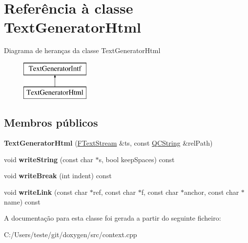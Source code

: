 \hypertarget{class_text_generator_html}{\section{Referência à classe Text\-Generator\-Html}
\label{class_text_generator_html}
}
Diagrama de heranças da classe Text\-Generator\-Html\begin{figure}[H]
\begin{center}
\leavevmode
\includegraphics[height=2.000000cm]{class_text_generator_html}
\end{center}
\end{figure}
\subsection*{Membros públicos}
\begin{DoxyCompactItemize}
\item 
\hypertarget{class_text_generator_html_a359ec0e7429b48fa4815f8b8247bb565}{{\bfseries Text\-Generator\-Html} (\hyperlink{class_f_text_stream}{F\-Text\-Stream} \&ts, const \hyperlink{class_q_c_string}{Q\-C\-String} \&rel\-Path)}\label{class_text_generator_html_a359ec0e7429b48fa4815f8b8247bb565}

\item 
\hypertarget{class_text_generator_html_a49452ae8a5acd4e287686e1bdbac5c1f}{void {\bfseries write\-String} (const char $\ast$s, bool keep\-Spaces) const }\label{class_text_generator_html_a49452ae8a5acd4e287686e1bdbac5c1f}

\item 
\hypertarget{class_text_generator_html_ac40cf1dd4a7804346c00562baa8a74b2}{void {\bfseries write\-Break} (int indent) const }\label{class_text_generator_html_ac40cf1dd4a7804346c00562baa8a74b2}

\item 
\hypertarget{class_text_generator_html_af1d2ebe4365612b97bf599bac5b67541}{void {\bfseries write\-Link} (const char $\ast$ref, const char $\ast$f, const char $\ast$anchor, const char $\ast$name) const }\label{class_text_generator_html_af1d2ebe4365612b97bf599bac5b67541}

\end{DoxyCompactItemize}


A documentação para esta classe foi gerada a partir do seguinte ficheiro\-:\begin{DoxyCompactItemize}
\item 
C\-:/\-Users/teste/git/doxygen/src/context.\-cpp\end{DoxyCompactItemize}
